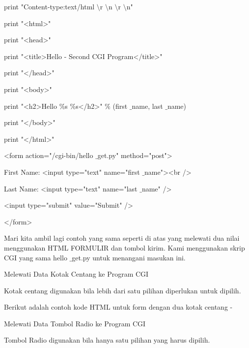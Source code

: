 \begin {enumerate}
\begin {enumerate}
\vspace{12pt}
\noindent
print "Content-type:text/html $  \setminus  $r $  \setminus  $n $  \setminus  $r $  \setminus  $n" \par
\noindent
print "<html>" \par
\noindent
print "<head>" \par
\noindent
print "<title>Hello - Second CGI Program</title>" \par
\noindent
print "</head>" \par
\noindent
print "<body>" \par
\noindent
print "<h2>Hello  $  \%  $s  $  \%  $s</h2>"  $  \%  $ (first $  \_  $name, last $  \_  $name) \par
\noindent
print "</body>" \par
\noindent
print "</html>" \par
\vspace{12pt}
\noindent
<form action="/cgi-bin/hello $  \_  $get.py" method="post"> \par
\noindent
First Name: <input type="text" name="first $  \_  $name"><br /> \par
\noindent
Last Name: <input type="text" name="last $  \_  $name" /> \par
\vspace{12pt}
\noindent
<input type="submit" value="Submit" /> \par
\noindent
</form> \par
\vspace{12pt}
Mari kita ambil lagi contoh yang sama seperti di atas yang melewati dua nilai menggunakan HTML FORMULIR dan tombol kirim. Kami menggunakan skrip CGI yang sama hello $  \_  $get.py untuk menangani masukan ini. \par
\noindent
Melewati Data Kotak Centang ke Program CGI \par
\vspace{12pt}
\noindent
Kotak centang digunakan bila lebih dari satu pilihan diperlukan untuk dipilih. \par
\vspace{12pt}
\noindent
Berikut adalah contoh kode HTML untuk form dengan dua kotak centang - \par
\vspace{12pt}
\noindent
Melewati Data Tombol Radio ke Program CGI \par
\vspace{12pt}
\noindent
Tombol Radio digunakan bila hanya satu pilihan yang harus dipilih. \par
\vspace{12pt}

\end{enumerate}
\end{enumerate}
